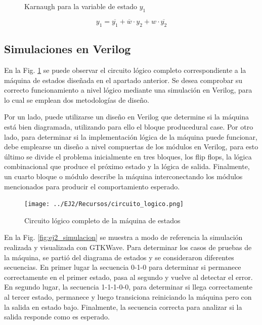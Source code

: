 \begin{figure}[H]
    \centering
    \begin{Karnaughvuit}
    \end{Karnaughvuit}
    \caption{Karnaugh para la variable de estado $y_1$}
\end{figure}

\begin{equation}
    y_1 = \overline{y_1} + \overline{w} \cdot y_2 + w \cdot \overline{y_2}
\end{equation}

\subsection{Simulaciones en Verilog}
En la Fig. \ref{fig:circuito_logico_ej2} se puede observar el circuito l\'ogico completo correspondiente a la m\'aquina de estados dise\~nada
en el apartado anterior. Se desea comprobar su correcto funcionamiento a nivel l\'ogico mediante una simulaci\'on en Verilog, para lo cual se emplean
dos metodolog\'ias de dise\~no.

Por un lado, puede utilizarse un dise\~no en Verilog que determine si la m\'aquina est\'a bien diagramada, utilizando para ello el bloque producedural case.
Por otro lado, para determinar si la implementaci\'on l\'ogica de la m\'aquina puede funcionar, debe emplearse un dise\~no a nivel compuertas de los m\'odulos en Verilog,
para esto \'ultimo se divide el problema inicialmente en tres bloques, los flip flops, la l\'ogica combinacional que produce el pr\'oximo estado y la l\'ogica de salida. Finalmente,
un cuarto bloque o m\'odulo describe la m\'aquina interconectando los m\'odulos mencionados para producir el comportamiento esperado.

\begin{figure}[H]
    \centering
    \texttt{[image: ../EJ2/Recursos/circuito\_logico.png]}
    \caption{Circuito l\'ogico completo de la m\'aquina de estados}
    \label{fig:circuito_logico_ej2}
\end{figure}

En la Fig. \ref{fig:ej2_simulacion} se muestra a modo de referencia la simulaci\'on realizada y visualizada con GTKWave. Para determinar los casos de pruebas de la m\'aquina,
se parti\'o del diagrama de estados y se consideraron diferentes secuencias. En primer lugar la secuencia 0-1-0 para determinar si permanece correctamente en el primer estado,
pasa al segundo y vuelve al detectar el error. En segundo lugar, la secuencia 1-1-1-0-0, para determinar si llega correctamente al tercer estado, permanece y luego transiciona reiniciando
la m\'aquina pero con la salida en estado bajo. Finalmente, la secuencia correcta para analizar si la salida responde como es esperado.

